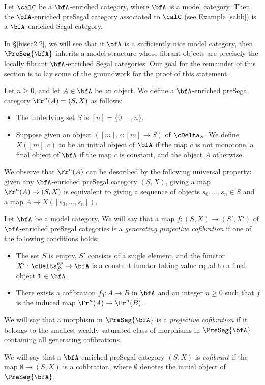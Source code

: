 \begin{example}\label{stepp1}
Let $\calC$ be a $\bfA$-enriched category, where $\bfA$ is a model category. Then the $\bfA$-enriched preSegal category associated to $\calC$ (see Example \ref{sabb}) is a $\bfA$-enriched Segal category.
\end{example}

In \S \ref{bisec2.2}, we will see that if $\bfA$ is a sufficiently nice model category, then
$\PreSeg{\bfA}$ inherits a model structure whose fibrant objects are precisely the
locally fibrant $\bfA$-enriched Segal categories. Our goal for the remainder of this section
is to lay some of the groundwork for the proof of this statement.

\begin{notation}
Let $n \geq 0$, and let $A \in \bfA$ be an object. We define a $\bfA$-enriched preSegal category
$\Fr^{n}(A)=(S, X)$ as follows:
\begin{itemize}
\item The underlying set $S$ is $[n] = \{0, \ldots, n \}$.
\item Suppose given an object $( [m], c: [m] \rightarrow S)$ of $\cDelta_{S}$. We define
$X( [m], c)$ to be an initial object of $\bfA$ if the map $c$ is not monotone, 
a final object of $\bfA$ if the map $c$ is constant, and the object $A$ otherwise.
\end{itemize}
We observe that $\Fr^{n}(A)$ can be described by the following universal property:
given any $\bfA$-enriched preSegal category $(S,X)$, giving a map
$\Fr^{n}(A) \rightarrow (S,X)$ is equivalent to giving a sequence of objects
$s_0, \ldots, s_n \in S$ and a map $A \rightarrow X( [s_0, \ldots, s_n ] )$.
\end{notation}

\begin{definition}\label{scanpl}
Let $\bfA$ be a model category.
We will say that a map $f: (S,X) \rightarrow (S',X')$ of $\bfA$-enriched preSegal categories
is a {\it generating projective cofibration} if one of the following conditions holds:
\begin{itemize}
\item[$(a)$] The set $S$ is empty, $S'$ consists of a single element, and the functor
$X': \cDelta_{S'}^{op} \rightarrow \bfA$ is a constant functor taking value equal to a final object
${\bf 1} \in \bfA$.
\item[$(b)$] There exists a cofibration $f_0: A \rightarrow B$ in $\bfA$ and an integer $n \geq 0$ such that $f$ is the induced map $\Fr^n(A) \rightarrow \Fr^{n}(B)$.
\end{itemize}
We will say that a morphism in $\PreSeg{\bfA}$ is a {\it projective cofibration} if it belongs to the smallest
weakly saturated class of morphisms in $\PreSeg{\bfA}$ containing all generating cofibrations.

We will say that a $\bfA$-enriched preSegal category $(S,X)$ is {\it cofibrant} if the map
$\emptyset \rightarrow (S,X)$ is a cofibration, where $\emptyset$ denotes the initial object
of $\PreSeg{\bfA}$.
\end{definition}

